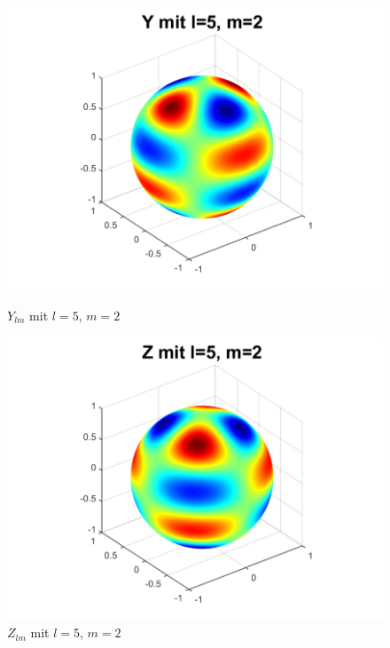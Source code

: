 \begin{refsection}
\begin{figure}
\begin{minipage}[hbt]{0.4\textwidth}
\includegraphics[width=1\textwidth]{kugel/ylm/a_5_2.pdf}
\caption{$Y_{lm}$ mit $l=5$, $m=2$}
\label{skript:ylm l=5 m=2}
\end{minipage}
\hfill
\begin{minipage}[hbt]{0.4\textwidth}
\centering
\includegraphics[width=1\textwidth]{kugel/ylm/b_5_2.pdf}
\caption{$Z_{lm}$ mit $l=5$, $m=2$}
\label{skript:zlm l=5 m=2}
\end{minipage}
\end{figure}


\end{refsection}
